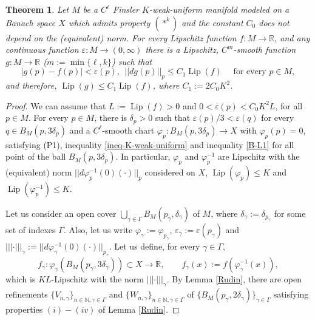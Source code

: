 \documentclass[11pt]{amsart}
\newtheorem{thm}{Theorem}[section]
\numberwithin{equation}{section}
\begin{document}
\begin{thm}\label{PalaisFinslerTheorem}
Let $M$ be a $C^\ell$ Finsler $K$-weak-uniform manifold modeled on a Banach space $X$ which admits property $(*^k)$ and the constant $C_0$ does not depend on the (equivalent) norm. For every Lipschitz function $f:M\to{\mathbb{R}}$, and any  continuous function $\varepsilon:M\to(0,\infty)$  there is a Lipschitz, $C^m$-smooth
 function $g:M\to{\mathbb{R}}$ ($m:={\min\{\ell,k\}}$) such that
\begin{equation*}
\left\vert g(p)-f(p) \right\vert<\varepsilon(p), \  \  || dg(p)||_p\le C_1 {\operatorname{Lip}}(f) \quad  \text{ for every } p\in M,
\end{equation*}
and therefore, $ {\operatorname{Lip}}(g)\le C_1 {\operatorname{Lip}}(f)$, where $C_1:=2C_0 K^2$.
\end{thm}
\begin{proof}
We can assume that $L:={\operatorname{Lip}}(f)>0$ and
 $0<\varepsilon(p)<C_0K^2L$, for all $p\in M$.
 For every $p\in M$, there is $\delta_p>0$ such that $\varepsilon(p)/3<\varepsilon(q)$ for every $q\in B_M(p,3\delta_p)$ and a $C^\ell$-smooth chart $\varphi_p:B_M(p,3\delta_p)\to X$ with $\varphi_p(p)=0$, satisfying (P1), inequality \eqref{ineq-K-weak-uniform} and inequality \eqref{B-L1} for all point of the ball $B_M(p,3\delta_p)$.
In particular, $\varphi_p$ and $\varphi_p^{-1}$ are Lipschitz with the (equivalent) norm $||d\varphi^{-1}_{p}(0)(\cdot)||_{p}$ considered on $X$, ${\operatorname{Lip}}(\varphi_p) \le K$ and ${\operatorname{Lip}}(\varphi_p^{-1}) \le K$.

Let us  consider an  open cover  $\bigcup_{\gamma\in \Gamma} B_M(p_\gamma,\delta_\gamma)$ of $M$,
where $\delta_{\gamma}:=\delta_{p_\gamma}$ for some set of indexes $ \Gamma$.  Also, let us
write $\varphi_\gamma:=\varphi_{p_\gamma}$, $\varepsilon_\gamma:=\varepsilon(p_\gamma)$ and
$|||\cdot|||_\gamma:=||d\varphi^{-1}_{\gamma}(0)(\cdot)||_{p_\gamma}$.
Let us define, for every $\gamma\in \Gamma$,
\begin{equation*}f_\gamma: \varphi_\gamma(B_M(p_\gamma,3\delta_\gamma))\subset X \to {\mathbb{R}},  \qquad
f_\gamma(x):=f(\varphi_{\gamma}^{-1}(x)),\end{equation*}
 which is $KL$-Lipschitz with the norm $|||\cdot|||_\gamma$.
By Lemma \ref{Rudin}, there are open refinements $\{V_{n,\gamma}\}_{n\in\mathbb{N},\gamma\in\Gamma}$ and $\{W_{n,\gamma}\}_{n\in\mathbb{N},\gamma\in\Gamma}$ of $\{B_M(p_\gamma,2\delta_\gamma)\}_{\gamma\in\Gamma}$ satisfying  properties $(i)-(iv)$ of Lemma \ref{Rudin}.


\end{proof}
\end{document}
